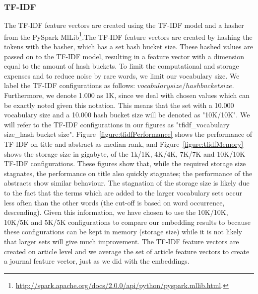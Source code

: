 \documentclass[../../paper.tex]{subfiles}
\begin{document}
\subsubsection{TF-IDF}
The TF-IDF feature vectors are created using the TF-IDF model and a hasher from the PySpark MlLib\footnote{\url{http://spark.apache.org/docs/2.0.0/api/python/pyspark.mllib.html}.}.The TF-IDF feature vectors are created by hashing the tokens with the hasher, which has a set hash bucket size. These hashed values are passed on to the TF-IDF model, resulting in a feature vector with a dimension equal to the amount of hash buckets. To limit the computational and storage expenses and to reduce noise by rare words, we limit our vocabulary size. We label the TF-IDF configurations as follows: $vocabulary size/hash bucket size$. Furthermore, we denote 1.000 as 1K, since we deal with chosen values which can be exactly noted given this notation. This means that the set with a 10.000 vocabulary size and a 10.000 hash bucket size will be denoted as "10K/10K". We will refer to the TF-IDF configurations in our figures as "tfidf\_vocabulary size\_hash bucket size". Figure~\ref{figure:tfidfPerformance} shows the performance of TF-IDF on title and abstract as median rank, and Figure~\ref{figure:tfidfMemory} shows the storage size in gigabyte, of the 1k/1K, 4K/4K, 7K/7K and 10K/10K TF-IDF configurations. These figures show that, while the required storage size stagnates, the performance on title also quickly stagnates; the performance of the abstracts show similar behaviour. The stagnation of the storage size is likely due to the fact that the terms which are added to the larger vocabulary sets occur less often than the other words (the cut-off is based on word occurrence, descending). Given this information, we have chosen to use the 10K/10K, 10K/5K and 5K/5K configurations to compare our embedding results to because these configurations can be kept in memory (storage size) while it is not likely that larger sets will give much improvement. The TF-IDF feature vectors are created on article level and we average the set of article feature vectors to create a journal feature vector, just as we did with the embeddings.
\end{document}
